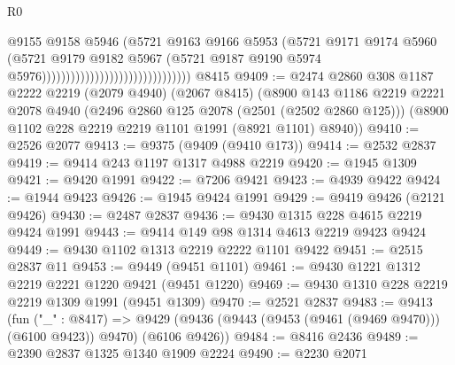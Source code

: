 \begin{lexlean}{R0}
\begin{coremodule}
                                                          @9155
                                                          @9158
                                                          @5946
                                                          (@5721
                                                            @9163
                                                            @9166
                                                            @5953
                                                            (@5721
                                                              @9171
                                                              @9174
                                                              @5960
                                                              (@5721
                                                                @9179
                                                                @9182
                                                                @5967
                                                                (@5721
                                                                  @9187
                                                                  @9190
                                                                  @5974
                                                                  @5976)))))))))))))))))))))))))))))))
    @8415
@9409 := @2474
    @2860
    @308
    @1187
    @2222
    @2219
    (@2079 @4940)
    (@2067 @8415)
    (@8900
      @143
      @1186
      @2219
      @2221
      @2078
      @4940
      (@2496 @2860 @125 @2078 (@2501 (@2502 @2860 @125)))
      (@8900 @1102 @228 @2219 @2219 @1101 @1991 (@8921 @1101) @8940))
@9410 := @2526 @2077
@9413 := @9375 (@9409 (@9410 @173))
@9414 := @2532 @2837
@9419 := @9414 @243 @1197 @1317 @4988 @2219
@9420 := @1945 @1309
@9421 := @9420 @1991
@9422 := @7206 @9421
@9423 := @4939 @9422
@9424 := @1944 @9423
@9426 := @1945 @9424 @1991
@9429 := @9419 @9426 (@2121 @9426)
@9430 := @2487 @2837
@9436 := @9430 @1315 @228 @4615 @2219 @9424 @1991
@9443 := @9414 @149 @98 @1314 @4613 @2219 @9423 @9424
@9449 := @9430 @1102 @1313 @2219 @2222 @1101 @9422
@9451 := @2515 @2837 @11
@9453 := @9449 (@9451 @1101)
@9461 := @9430 @1221 @1312 @2219 @2221 @1220 @9421 (@9451 @1220)
@9469 := @9430 @1310 @228 @2219 @2219 @1309 @1991 (@9451 @1309)
@9470 := @2521 @2837
@9483 := @9413
    (fun ("_" : @8417) =>
    @9429 (@9436 (@9443 (@9453 (@9461 (@9469 @9470))) (@6100 @9423)) @9470) (@6106 @9426))
@9484 := @8416 @2436
@9489 := @2390 @2837 @1325 @1340 @1909 @2224
@9490 := @2230 @2071

\end{coremodule}
\end{lexlean}
